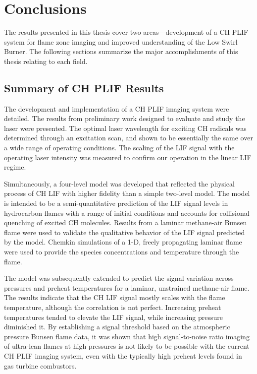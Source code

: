 \chapter{Conclusions}
\label{ch:conclusions}

The results presented in this thesis cover two areas---development of a CH PLIF system for flame zone imaging and improved understanding of the Low Swirl Burner.
The following sections summarize the major accomplishments of this thesis relating to each field.

\section{Summary of CH PLIF Results}

The development and implementation of a CH PLIF imaging system were detailed.
The results from preliminary work designed to evaluate and study the laser were presented.
The optimal laser wavelength for exciting CH radicals was determined through an excitation scan, and shown to be essentially the same over a wide range of operating conditions.
The scaling of the LIF signal with the operating laser intensity was measured to confirm our operation in the linear LIF regime.

Simultaneously, a four-level model was developed that reflected the physical process of CH LIF with higher fidelity than a simple two-level model.
The model is intended to be a semi-quantitative prediction of the LIF signal levels in hydrocarbon flames with a range of initial conditions and accounts for collisional quenching of excited CH molecules.
Results from a laminar methane-air Bunsen flame were used to validate the qualitative behavior of the LIF signal predicted by the model.
Chemkin simulations of a 1-D, freely propagating laminar flame were used to provide the species concentrations and temperature through the flame.

The model was subsequently extended to predict the signal variation across pressures and preheat temperatures for a laminar, unstrained methane-air flame.
The results indicate that the CH LIF signal mostly scales with the flame temperature, although the correlation is not perfect.
Increasing preheat temperatures tended to elevate the LIF signal, while increasing pressure diminished it.
By establishing a signal threshold based on the atmospheric pressure Bunsen flame data, it was shown that high signal-to-noise ratio imaging of ultra-lean flames at high pressures is not likely to be possible with the current CH PLIF imaging system, even with the typically high preheat levels found in gas turbine combustors.

